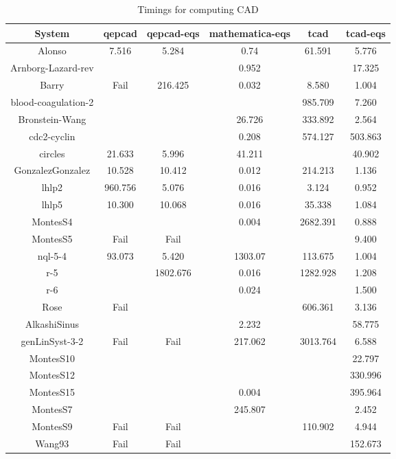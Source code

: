 \documentclass[10pt]{article}
\newcommand{\CAD}{{CAD}}
\begin{document}
\begin{center}
\begin{table}
\centering
\caption{Timings for computing {\CAD}}
\label{table:cad}
\begin{tabular}{|c|c|c|c|c|c|}\hline
System & qepcad & qepcad-eqs & mathematica-eqs & tcad & tcad-eqs\\ \hline
Alonso & 7.516 & 5.284 & 0.74& 	  61.591 & 	  5.776 \\
Arnborg-Lazard-rev & & & 0.952&  	  & 	  17.325 \\
Barry & Fail& 216.425 & 0.032& 	  8.580 & 	  1.004 \\
blood-coagulation-2 &  &  & & 	  985.709 & 	  7.260 \\
Bronstein-Wang &  &  & 26.726& 	  333.892 & 	  2.564 \\
cdc2-cyclin &  &  & 0.208& 	  574.127 & 	  503.863 \\
circles & 21.633 & 5.996 & 41.211&  	  & 	  40.902 \\
GonzalezGonzalez & 10.528 & 10.412 & 0.012& 	  214.213 & 	  1.136 \\
lhlp2 & 960.756 & 5.076 & 0.016& 	  3.124 & 	  0.952 \\
lhlp5 & 10.300 & 10.068 & 0.016& 	  35.338 & 	  1.084 \\
MontesS4 &   &  & 0.004& 	  2682.391 & 	  0.888 \\
MontesS5 & Fail & Fail & &  	  & 	  9.400 \\
nql-5-4 & 93.073 & 5.420 & 1303.07& 	  113.675 & 	  1.004 \\
r-5 & & 1802.676 & 0.016& 	  1282.928 & 	  1.208 \\
r-6 & &  & 0.024&  	  & 	  1.500 \\
Rose & Fail&   & & 	  606.361 & 	  3.136 \\
AlkashiSinus &                     &                     & 2.232&  	  & 	  58.775 \\
genLinSyst-3-2 &   Fail     &   Fail    & 217.062& 	  3013.764 & 	  6.588 \\
MontesS10 &    &    & &  	  & 	  22.797 \\
MontesS12 &   &   & &  	  & 	  330.996 \\
MontesS15 & & & 0.004&  	  & 	  395.964 \\
MontesS7 &  & & 245.807&  	  & 	  2.452 \\
MontesS9 &Fail & Fail & & 	  110.902 & 	  4.944 \\
Wang93 & Fail& Fail& &  	  & 	  152.673 \\

\hline
\end{tabular}
\end{table}




\end{center}
\end{document}
